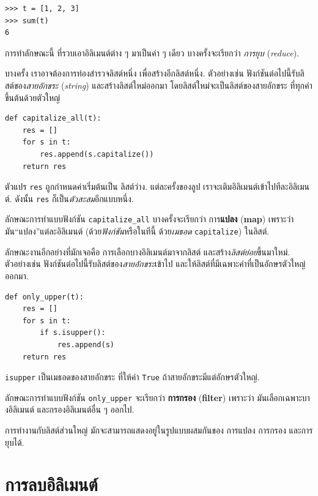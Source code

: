 \begin{verbatim}
>>> t = [1, 2, 3]
>>> sum(t)
6
\end{verbatim}
%
การทำลักษณะนี้ ที่รวบเอาอิลิเมนต์ต่าง ๆ มาเป็นค่า ๆ เดียว
บางครั้งจะเรียกว่า \textit{การยุบ} (\textit{reduce}).

บางครั้ง เราอาจต้องการท่องสำรวจลิสต์หนึ่ง เพื่อสร้างอีกลิสต์หนึ่ง.  
ตัวอย่างเช่น ฟังก์ชันต่อไปนี้รับลิสต์ของ\textit{สายอักขระ} (\textit{string}) และสร้างลิสต์ใหม่ออกมา โดยลิสต์ใหม่จะเป็นลิสต์ของสายอักขระ ที่ทุกคำขึ้นต้นด้วยตัวใหญ่

\begin{verbatim}
def capitalize_all(t):
    res = []
    for s in t:
        res.append(s.capitalize())
    return res
\end{verbatim}
%
ตัวแปร \texttt{res} ถูกกำหนดค่าเริ่มต้นเป็น ลิสต์ว่าง.
แต่ละครั้งของลูป เราจะเติมอิลิเมนต์เข้าไปทีละอิลิเมนต์.  
ดังนั้น \texttt{res} ก็เป็น\textit{ตัวสะสม}อีกแบบหนึ่ง.

ลักษณะการทำแบบฟังก์ชัน \verb|capitalize_all| 
บางครั้งจะเรียกว่า การ\textbf{แปลง} (\textbf{map})
เพราะว่า มัน``แปลง''แต่ละอิลิเมนต์ (ด้วย\textit{ฟังก์ชัน}หรือในทีนี้ ด้วย\textit{เมธอด} \texttt{capitalize}) ในลิสต์.

ลักษณะงานอีกอย่างที่มักเจอคือ การเลือกบางอิลิเมนต์มาจากลิสต์
และสร้าง\textit{ลิสต์ย่อย}ขึ้นมาใหม่.
ตัวอย่างเช่น ฟังก์ชันต่อไปนี้รับลิสต์ของ\textit{สายอักขระ}เข้าไป และให้ลิสต์ที่มีเฉพาะคำที่เป็นอักษรตัวใหญ่ออกมา.

\begin{verbatim}
def only_upper(t):
    res = []
    for s in t:
        if s.isupper():
            res.append(s)
    return res
\end{verbatim}
%
\texttt{isupper} เป็นเมธอดของสายอักขระ ที่ให้ค่า \texttt{True} ถ้าสายอักขระมีแต่อักษรตัวใหญ่.

ลักษณะการทำแบบฟังก์ชัน \verb|only_upper| จะเรียกว่า
\textbf{การกรอง} (\textbf{filter})
เพราะว่า มันเลือกเฉพาะบางอิลิเมนต์ และกรองอิลิเมนต์อื่น ๆ ออกไป.

การทำงานกับลิสต์ส่วนใหญ่ มักจะสามารถแสดงอยู่ในรูปแบบผสมกันของ การแปลง การกรอง และการยุบได้.


\section{การลบอิลิเมนต์}

